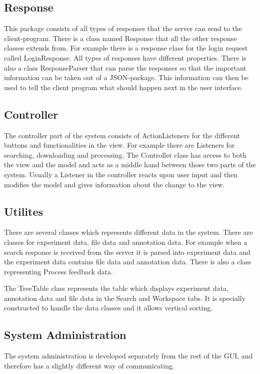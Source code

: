 \subsection{Response}
This package consists of all types of responses that the server can send to the client-program. There is a class named Response that all the other response classes extends from. For example there is a response class for the login request called LoginResponse. All types of responses have different properties. There is also a class ResponseParser that can parse the responses so that the important information can be taken out of a JSON-package. This information can then be used to tell the client program what should happen next in the user interface.


\subsection{Controller}
The controller part of the system consists of ActionListeners for the different buttons and functionalities in the view. For example there are Listeners for searching, downloading and processing. The Controller class has access to both the view and the model and acts as a middle hand between those two parts of the system. Usually a Listener in the controller reacts upon user input and then modifies the model and gives information about the change to the view.


\subsection{Utilites}

There are several classes which represents different data in the system. There are classes for experiment data, file data and annotation data. For example when a search response is received from the server it is parsed into experiment data and the experiment data contains file data and annotation data. There is also a class representing Process feedback data.

The TreeTable class represents the table which displays experiment data, annotation data and file data in the Search and Workspace tabs. It is specially constructed to handle the data classes and it allows vertical sorting.

\subsection{System Administration}
The system administration is developed separately from the rest of the GUI, and therefore has a slightly different way of communicating.

